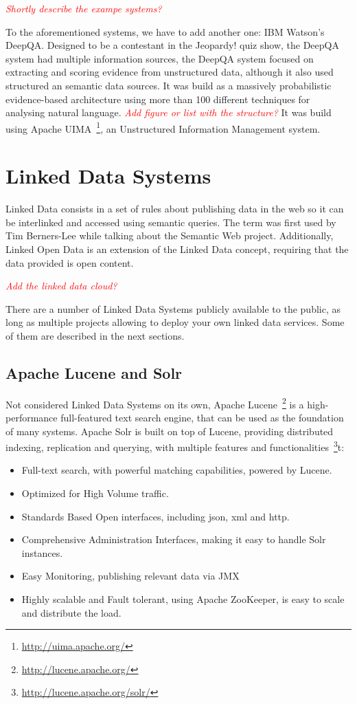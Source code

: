 \emph{\textcolor{red}{Shortly describe the exampe systems?}}

To the aforementioned systems, we have to add another one: IBM Watson's DeepQA. Designed to be a contestant in the Jeopardy! quiz show, the DeepQA system had multiple information sources, the DeepQA system focused on extracting and scoring evidence from unstructured data, although it also used structured an semantic data sources. It was build as a massively probabilistic evidence-based architecture using more than 100 different techniques for analysing natural language. \emph{\textcolor{red}{Add figure or list with the structure?}} It was build using Apache UIMA~\footnote{\url{http://uima.apache.org/}}, an Unstructured Information Management system.

\section{Linked Data Systems}
\label{sec:linkd_sys}

Linked Data consists in a set of rules about publishing data in the web so it can be interlinked and accessed using semantic queries. The term was first used by Tim Berners-Lee while talking about the Semantic Web project. Additionally, Linked Open Data is an extension of the Linked Data concept, requiring that the data provided is open content.

\emph{\textcolor{red}{Add the linked data cloud?}}

There are a number of Linked Data Systems publicly available to the public, as long as multiple projects allowing to deploy your own linked data services. Some of them are described in the next sections. 

\subsection{Apache Lucene and Solr}
\label{sec:statesolr}

Not considered Linked Data Systems on its own, Apache Lucene~\footnote{\url{http://lucene.apache.org/}} is a high-performance full-featured text search engine, that can be used as the foundation of many systems. Apache Solr is built on top of Lucene, providing distributed indexing, replication and querying, with multiple features and functionalities~\footnote{\url{http://lucene.apache.org/solr/}}t:

\begin{itemize}[topsep=0pt,itemsep=-1ex,partopsep=1ex,parsep=1ex]
  \item Full-text search, with powerful matching capabilities, powered by Lucene.
  \item Optimized for High Volume traffic.
  \item Standards Based Open interfaces, including json, xml and http.
  \item Comprehensive Administration Interfaces, making it easy to handle Solr instances.
  \item Easy Monitoring, publishing relevant data via JMX
  \item Highly scalable and Fault tolerant, using Apache ZooKeeper, is easy to scale and distribute the load.
\end{itemize}


